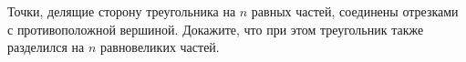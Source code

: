 \begin{ex}
	\begin{condition}
		Точки, делящие сторону треугольника на \( n \) равных частей, соединены отрезками с противоположной вершиной. Докажите, что при этом треугольник также разделился на \( n \) равновеликих частей.
	\end{condition}
\end{ex}